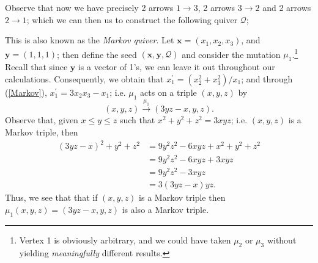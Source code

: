 Observe that now we have precisely 2 arrows $1 \rightarrow 3$, 2 arrows $3 \rightarrow 2$ and 2 arrows $2 \rightarrow 1$; which we can then us to construct the following quiver $\mathcal{Q}$;
\begin{figure}[H]
    \centering
\end{figure}
This is also known as the \emph{Markov quiver}. Let $\mathbf{x} = (x_1,x_2,x_3)$, and $\mathbf{y} = (1,1,1)$; then define the seed $(\mathbf{x},\mathbf{y},\mathcal{Q})$ and consider the mutation $\mu_1$.\footnote{Vertex 1 is obviously arbitrary, and we could have taken $\mu_2$ or $\mu_3$ without yielding \emph{meaningfully} different results.} Recall that since $\mathbf{y}$ is a vector of 1's, we can leave it out throughout our calculations. Consequently, we obtain that $x_1^{'} = (x_2^2 + x_3^2)/x_1$; and through (\ref{Markov}), $x_1^{'} = 3x_2x_3 - x_1$; i.e. $\mu_1$ acts on a triple $(x,y,z)$ by 
\begin{equation}
    (x,y,z) \xrightarrow{\mu_1} (3yz-x,y,z).
\end{equation}
Observe that, given $x\leq y \leq z$ such that $x^2 + y^2 +z^2 = 3xyz$; i.e. $(x,y,z)$ is a Markov triple, then
\begin{align*}
    (3yz-x)^2 + y^2 + z^2 &= 9y^2z^2 - 6xyz + x^2 + y^2 + z^2 \\
    &= 9y^2z^2 - 6xyz + 3xyz \\
    &= 9y^2z^2-3xyz \\
    &= 3(3yz-x)yz.
\end{align*}
Thus, we see that that if $(x,y,z)$ is a Markov triple then $\mu_1(x,y,z) = (3yz-x,y,z)$ is also a Markov triple.

